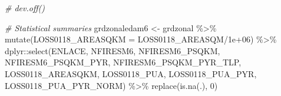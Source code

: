 \documentclass[10pt,landscape,a3paper]{article}
\newenvironment{Shaded}{\begin{snugshade}}{\end{snugshade}}
\newcommand{\AttributeTok}[1]{\textcolor[rgb]{0.77,0.63,0.00}{#1}}
\newcommand{\CommentTok}[1]{\textcolor[rgb]{0.56,0.35,0.01}{\textit{#1}}}
\newcommand{\DecValTok}[1]{\textcolor[rgb]{0.00,0.00,0.81}{#1}}
\newcommand{\FloatTok}[1]{\textcolor[rgb]{0.00,0.00,0.81}{#1}}
\newcommand{\FunctionTok}[1]{\textcolor[rgb]{0.00,0.00,0.00}{#1}}
\newcommand{\NormalTok}[1]{#1}
\newcommand{\OtherTok}[1]{\textcolor[rgb]{0.56,0.35,0.01}{#1}}
\newcommand{\SpecialCharTok}[1]{\textcolor[rgb]{0.00,0.00,0.00}{#1}}
\begin{document}
\begin{Shaded}
\begin{Highlighting}[]
\CommentTok{\# dev.off()}

\CommentTok{\# Statistical summaries}
\NormalTok{grdzonaledam6 }\OtherTok{\textless{}{-}}\NormalTok{ grdzonal }\SpecialCharTok{\%\textgreater{}\%}
    \FunctionTok{mutate}\NormalTok{(}\AttributeTok{LOSS0118\_AREASQKM =}\NormalTok{ LOSS0118\_AREASQM}\SpecialCharTok{/}\FloatTok{1e+06}\NormalTok{) }\SpecialCharTok{\%\textgreater{}\%}
\NormalTok{    dplyr}\SpecialCharTok{::}\FunctionTok{select}\NormalTok{(ENLACE, NFIRESM6, NFIRESM6\_PSQKM, NFIRESM6\_PSQKM\_PYR, NFIRESM6\_PSQKM\_PYR\_TLP,}
\NormalTok{        LOSS0118\_AREASQKM, LOSS0118\_PUA, LOSS0118\_PUA\_PYR, LOSS0118\_PUA\_PYR\_NORM) }\SpecialCharTok{\%\textgreater{}\%}
    \FunctionTok{replace}\NormalTok{(}\FunctionTok{is.na}\NormalTok{(.), }\DecValTok{0}\NormalTok{)}


\end{Highlighting}
\end{Shaded}
\end{document}
